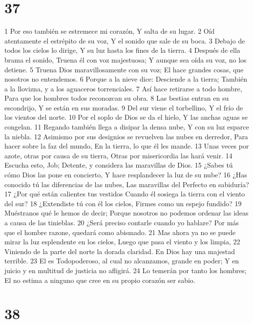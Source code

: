 \chapter{37}


1 Por eso también se estremece mi corazón,  
Y salta de su lugar.  
2 Oíd atentamente el estrépito de su voz,  
Y el sonido que sale de su boca.  
3 Debajo de todos los cielos lo dirige,  
Y su luz hasta los fines de la tierra.  
4 Después de ella brama el sonido,  
Truena él con voz majestuosa;  
Y aunque sea oída su voz, no los detiene.  
5 Truena Dios maravillosamente con su voz;  
El hace grandes cosas, que nosotros no entendemos.  
6 Porque a la nieve dice: Desciende a la tierra;  
También a la llovizna, y a los aguaceros torrenciales.  
7 Así hace retirarse a todo hombre,  
Para que los hombres todos reconozcan su obra.  
8 Las bestias entran en su escondrijo,  
Y se están en sus moradas.  
9 Del sur viene el torbellino,  
Y el frío de los vientos del norte.  
10 Por el soplo de Dios se da el hielo,  
Y las anchas aguas se congelan.  
11 Regando también llega a disipar la densa nube,  
Y con su luz esparce la niebla.  
12 Asimismo por sus designios se revuelven las nubes en derredor,  
Para hacer sobre la faz del mundo,  
En la tierra, lo que él les mande.  
13 Unas veces por azote, otras por causa de su tierra,  
Otras por misericordia las hará venir.  
14 Escucha esto, Job;  
Detente, y considera las maravillas de Dios.  
15 ¿Sabes tú cómo Dios las pone en concierto,  
Y hace resplandecer la luz de su nube?  
16 ¿Has conocido tú las diferencias de las nubes,  
Las maravillas del Perfecto en sabiduría?  
17 ¿Por qué están calientes tus vestidos  
Cuando él sosiega la tierra con el viento del sur?  
18 ¿Extendiste tú con él los cielos,  
Firmes como un espejo fundido? 
19 Muéstranos qué le hemos de decir; 
Porque nosotros no podemos ordenar las ideas a causa de las tinieblas.  
20 ¿Será preciso contarle cuando yo hablare?  
Por más que el hombre razone, quedará como abismado.  
21 Mas ahora ya no se puede mirar la luz esplendente en los cielos,  
Luego que pasa el viento y los limpia,  
22 Viniendo de la parte del norte la dorada claridad.  
En Dios hay una majestad terrible.  
23 El es Todopoderoso, al cual no alcanzamos, grande en poder;  
Y en juicio y en multitud de justicia no afligirá.  
24 Lo temerán por tanto los hombres;  
El no estima a ninguno que cree en su propio corazón ser sabio.  

\chapter{38}

